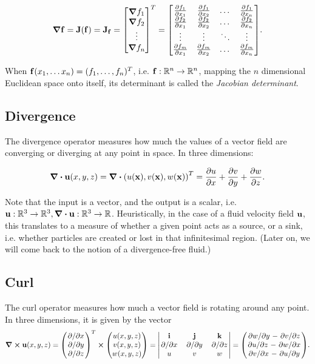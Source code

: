 \begin{equation}\label{eq:jacobian-matrix}
\grad \vb{f} = \vb{J}(\vb{f}) = \vb{J}_{\vb{f}}=
\mqty[\grad{f_1}\\\grad{f_2}\\\vdots\\\grad f_n]^T = 
\mqty[
\pdv{f_1}{x_1} & \pdv{f_1}{x_2} & \dots & \pdv{f_1}{x_n}\\
\pdv{f_2}{x_1} & \pdv{f_2}{x_2} & \dots & \pdv{f_2}{x_n}\\
\vdots         &    \vdots      & \ddots & \vdots \\
\pdv{f_m}{x_1} & \pdv{f_m}{x_2} & \dots & \pdv{f_m}{x_n}
].
\end{equation}

When $\vb{f}(x_1,\dots x_n) = (f_1, \dots, f_n)^T$, i.e. $\vb{f}: \mathbb{R}^n
\to \mathbb{R}^n$, mapping the $n$ dimensional Euclidean space onto itself,
its determinant is called the \textit{Jacobian determinant}.

\subsection*{Divergence}
The divergence operator measures how much the values of a vector field are
converging or diverging at any point in space. In three dimensions:

$$\div{\vb{u}(x,y,z)} = \div(u(\vb{x}), v(\vb{x}), w(\vb{x}))^T = 
\pdv{u}{x}+\pdv{v}{y}+\pdv{w}{z}.$$

Note that the input is a vector, and the output is a scalar, i.e. $\vb{u}:
\mathbb{R}^3 \to \mathbb{R}^3, \div{\vb{u}}: \mathbb{R}^3\to\mathbb{R}$.
Heuristically, in the case of a fluid velocity field $\vb{u}$, this translates
to a measure of whether a given point acts as a source, or a sink, i.e. whether
particles are created or lost in that infinitesimal region. (Later on, we will
come back to the notion of a divergence-free fluid.)

\subsection*{Curl}\label{section:curl}
The curl operator measures how much a vector field is rotating around any point. 
In three dimensions, it is given by the vector
$$\curl{\vb{u}(x,y,z) = 
    \mqty(\pdv*{x} \\ \pdv*{y} \\  \pdv*{z})^T \cross 
    \mqty(u(x,y,z) \\ v(x,y,z) \\ w(x,y,z))
= \mqty|
    \vb{i}   & \vb{j}   & \vb{k}   \\
    \pdv*{x} & \pdv*{y} & \pdv*{z} \\
    u        & v        & w
|} = \mqty(
\pdv*{w}{y} - \pdv*{v}{z} \\
\pdv*{u}{z} - \pdv*{w}{x} \\
\pdv*{v}{x} - \pdv*{u}{y}
).$$

